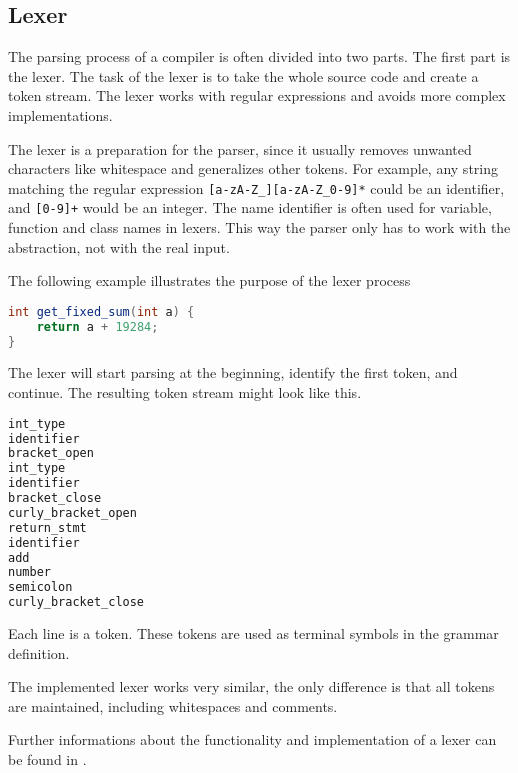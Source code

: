 
\subsection{Lexer}

The parsing process of a compiler is often divided into two parts. The first part is the lexer. 
The task of the lexer is to take the whole source code and create a token stream. 
The lexer works with regular expressions and avoids more complex implementations.

The lexer is a preparation for the parser, since it usually removes unwanted characters like whitespace and generalizes other tokens.
For example, any string matching the regular expression \verb|[a-zA-Z_][a-zA-Z_0-9]*| could be an identifier, and \verb|[0-9]+| would be an integer. 
The name identifier is often used for variable, function and class names in lexers. 
This way the parser only has to work with the abstraction, not with the real input.

The following example illustrates the purpose of the lexer process
\begin{lstlisting}[language=Java, caption="Example input for the lexer"]
int get_fixed_sum(int a) {
    return a + 19284;
}
\end{lstlisting}

The lexer will start parsing at the beginning, identify the first token, and continue. The resulting token stream might look like this.

\begin{lstlisting}[language=Java, caption="Example output of the lexer"]
int_type 
identifier
bracket_open
int_type
identifier
bracket_close
curly_bracket_open
return_stmt
identifier
add
number
semicolon
curly_bracket_close
\end{lstlisting}

Each line is a token. These tokens are used as terminal symbols in the grammar definition.

The implemented lexer works very similar, the only difference is that all tokens are maintained, including whitespaces and comments.

Further informations about the functionality and implementation of a lexer can be found in \cite[pages 109-189]{AhoLSU2006}.